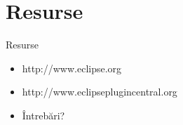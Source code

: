 \documentclass{beamer}
\begin{document}
\section{Resurse}

\begin{frame}{Resurse}
  \begin{itemize}
  \item http://www.eclipse.org
  \pause
  \item http://www.eclipseplugincentral.org  
  \pause
  \vspace{10mm}
  \item Întrebări?
  \end{itemize}
\end{frame}

\begin{frame}{}
\end{frame}
\end{document}
